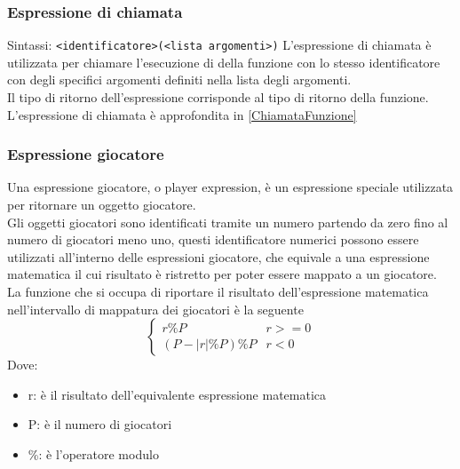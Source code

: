 \subsubsection{Espressione di chiamata}
Sintassi: \lstinline|<identificatore>(<lista argomenti>)|
L'espressione di chiamata è utilizzata per chiamare l'esecuzione di della funzione con lo 
stesso identificatore con degli specifici argomenti definiti nella lista degli argomenti. \\
Il tipo di ritorno dell'espressione corrisponde al tipo di ritorno della funzione. \\
L'espressione di chiamata è approfondita in \ref*{ChiamataFunzione}

\subsubsection{Espressione giocatore} \label{EspressioniGiocatore}
Una espressione giocatore, o player expression, è un espressione speciale utilizzata per ritornare 
un oggetto giocatore. 
\\
Gli oggetti giocatori sono identificati tramite un numero partendo da zero fino al numero di giocatori meno uno,
questi identificatore numerici possono essere utilizzati all'interno delle espressioni giocatore, che equivale 
a una espressione matematica il cui risultato è ristretto per poter essere mappato a un giocatore.
\\
La funzione che si occupa di riportare il risultato dell'espressione matematica nell'intervallo di 
mappatura dei giocatori è la seguente
\[
\begin{cases}
    r \% P  & r >= 0 \\
    (P - |r| \% P) \% P & r < 0
\end{cases}
\] 
Dove:
\begin{itemize}
    \item r: è il risultato dell'equivalente espressione matematica
    \item P: è il numero di giocatori
    \item \%: è l'operatore modulo
\end{itemize}

